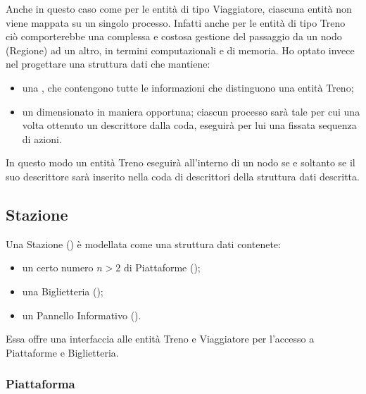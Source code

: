 	Anche in questo caso come per le entità di tipo Viaggiatore, ciascuna entità non viene mappata su un singolo processo. Infatti anche per le entità di tipo Treno ciò comporterebbe una complessa e costosa gestione del passaggio da un nodo (Regione) ad un altro, in termini computazionali e di memoria. 
	Ho optato invece nel progettare una struttura dati  che mantiene:
		\begin{itemize}
			\item una , che contengono tutte le informazioni che distinguono una entità Treno;
			\item un  dimensionato in maniera opportuna; ciascun processo sarà tale per cui una volta ottenuto un descrittore dalla coda, eseguirà per lui una fissata sequenza di azioni.
		\end{itemize}
	In questo modo un entità Treno eseguirà all'interno di un nodo se e soltanto se il suo descrittore sarà inserito nella coda di descrittori della struttura dati descritta.
				
	\subsection{Stazione} \label{subsec:station}
	
	Una Stazione () è modellata come una struttura dati contenete:
		\begin{itemize}
			\item un certo numero $ n > 2$ di Piattaforme ();
			\item una Biglietteria ();
			\item un Pannello Informativo ().
		\end{itemize}
	Essa offre una interfaccia alle entità Treno e Viaggiatore per l'accesso a Piattaforme e Biglietteria.
		
		\subsubsection{Piattaforma}
	
